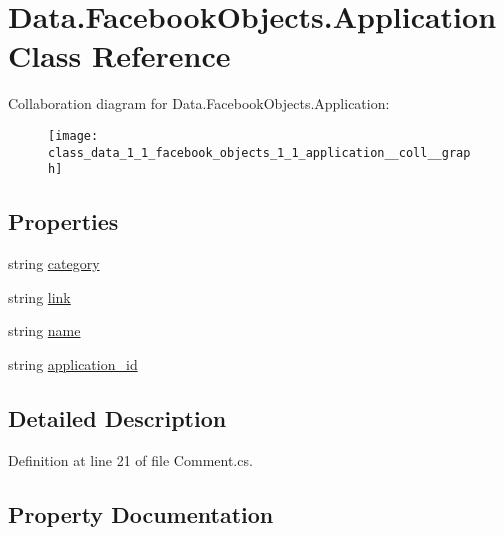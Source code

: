 \hypertarget{class_data_1_1_facebook_objects_1_1_application}{}\section{Data.\+Facebook\+Objects.\+Application Class Reference}
\label{class_data_1_1_facebook_objects_1_1_application}


Collaboration diagram for Data.\+Facebook\+Objects.\+Application\+:
\nopagebreak
\begin{figure}[H]
\begin{center}
\leavevmode
\texttt{[image: class\_data\_1\_1\_facebook\_objects\_1\_1\_application\_\_coll\_\_graph]}
\end{center}
\end{figure}
\subsection*{Properties}
\begin{DoxyCompactItemize}
\item 
string \hyperlink{class_data_1_1_facebook_objects_1_1_application_aa672437a8fd9f3398baf2cd7491a929a}{category}
\item 
string \hyperlink{class_data_1_1_facebook_objects_1_1_application_ae209b254e59693c4f2ad2c774d908426}{link}
\item 
string \hyperlink{class_data_1_1_facebook_objects_1_1_application_a792e5e532e207d17755ec6f6a5b7f47f}{name}
\item 
string \hyperlink{class_data_1_1_facebook_objects_1_1_application_a4033dd840557cd10d936869a4b9dab85}{application\+\_\+id}
\end{DoxyCompactItemize}


\subsection{Detailed Description}


Definition at line 21 of file Comment.\+cs.



\subsection{Property Documentation}
